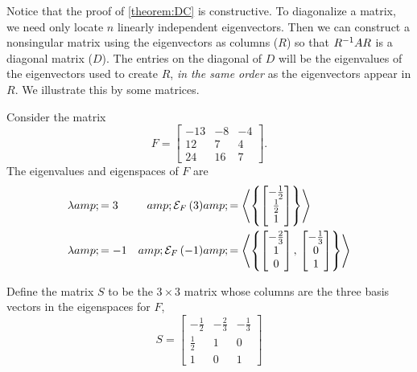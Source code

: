 \documentclass{ximera}
\begin{document}
Notice that the proof of \ref{theorem:DC} is constructive.  To
diagonalize a matrix, we need only locate $n$ linearly independent
eigenvectors.  Then we can construct a nonsingular matrix using the
eigenvectors as columns ($R$) so that $R^{-1}AR$ is a diagonal
matrix ($D$).  The entries on the diagonal of $D$ will be the
eigenvalues of the eigenvectors used to create $R$, \textit{in the
  same order} as the eigenvectors appear in $R$.  We illustrate this
by  some matrices.

\begin{example}

Consider the matrix
\[
F=
\begin{bmatrix}
-13 & -8 & -4\\
12 & 7 & 4\\
24 & 16 & 7
\end{bmatrix}.
\]
The eigenvalues and eigenspaces of $F$ are
\begin{align*}
\lambda&amp;=3&amp;\mathcal{E}_{F}\left(3\right)&amp;=\left\langle\left\{\begin{bmatrix}-\frac{1}{2}\\\frac{1}{2}\\1\end{bmatrix}\right\}\right\rangle\\
\lambda&amp;=-1&amp;\mathcal{E}_{F}\left(-1\right)&amp;=\left\langle\left\{\begin{bmatrix}-\frac{2}{3}\\1\\0\end{bmatrix},\,\begin{bmatrix}-\frac{1}{3}\\0\\1\end{bmatrix}\right\}\right\rangle
\end{align*}

Define the matrix $S$ to be the $3\times 3$ matrix whose columns are
the three basis vectors in the eigenspaces for $F$,
\[
S=
\begin{bmatrix}
-\frac{1}{2} & -\frac{2}{3} & -\frac{1}{3}\\
\frac{1}{2} & 1 & 0\\
1 & 0 & 1
\end{bmatrix}
\]


\end{example}
\end{document}
